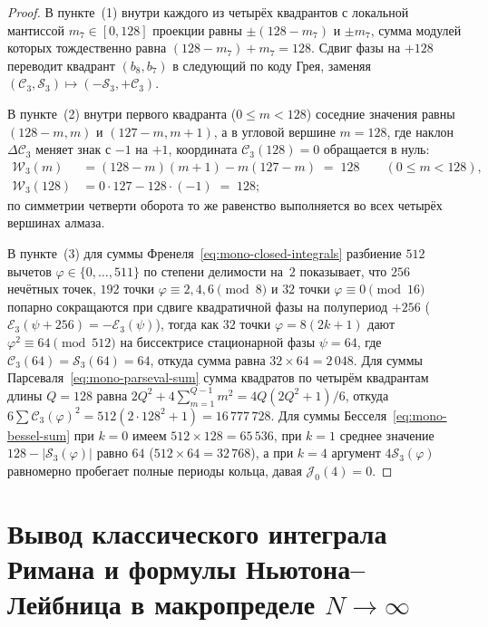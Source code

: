 \begin{proof}
В пункте~(1) внутри каждого из четырёх квадрантов с локальной мантиссой $m_7 \in [0, 128]$ проекции равны $\pm(128 - m_7)$ и $\pm m_7$, сумма модулей которых тождественно равна $(128 - m_7) + m_7 = 128$. Сдвиг фазы на $+128$ переводит квадрант $(b_8, b_7)$ в следующий по коду Грея, заменяя $(\mathcal{C}_3, \mathcal{S}_3) \mapsto (-\mathcal{S}_3, +\mathcal{C}_3)$.

В пункте~(2) внутри первого квадранта ($0 \le m < 128$) соседние значения равны $(128 - m, m)$ и $(127 - m, m + 1)$, а в угловой вершине $m = 128$, где наклон $\Delta\mathcal{C}_3$ меняет знак с $-1$ на $+1$, координата $\mathcal{C}_3(128) = 0$ обращается в нуль:
\begin{align*}
  \mathcal{W}_3(m) &= (128 - m)(m + 1) - m(127 - m) \;=\; 128 \qquad (0 \le m < 128), \\
  \mathcal{W}_3(128) &= 0 \cdot 127 - 128 \cdot (-1) \;=\; 128;
\end{align*}
по симметрии четверти оборота то же равенство выполняется во всех четырёх вершинах алмаза.

В пункте~(3) для суммы Френеля~\eqref{eq:mono-closed-integrals} разбиение $512$ вычетов $\varphi \in \{0,\dots,511\}$ по степени делимости на~$2$ показывает, что $256$ нечётных точек, $192$ точки $\varphi \equiv 2, 4, 6 \pmod 8$ и $32$ точки $\varphi \equiv 0 \pmod{16}$ попарно сокращаются при сдвиге квадратичной фазы на полупериод $+256$ ($\mathcal{E}_3(\psi + 256) = -\mathcal{E}_3(\psi)$), тогда как $32$ точки $\varphi = 8(2k + 1)$ дают $\varphi^2 \equiv 64 \pmod{512}$ на биссектрисе стационарной фазы $\psi = 64$, где $\mathcal{C}_3(64) = \mathcal{S}_3(64) = 64$, откуда сумма равна $32 \times 64 = 2\,048$. Для суммы Парсеваля~\eqref{eq:mono-parseval-sum} сумма квадратов по четырём квадрантам длины $Q = 128$ равна $2 Q^2 + 4\sum_{m=1}^{Q-1} m^2 = 4Q(2Q^2 + 1)/6$, откуда $6\sum \mathcal{C}_3(\varphi)^2 = 512(2\cdot 128^2 + 1) = 16\,777\,728$. Для суммы Бесселя~\eqref{eq:mono-bessel-sum} при $k = 0$ имеем $512\times 128 = 65\,536$, при $k = 1$ среднее значение $128 - |\mathcal{S}_3(\varphi)|$ равно $64$ ($512\times 64 = 32\,768$), а при $k = 4$ аргумент $4\mathcal{S}_3(\varphi)$ равномерно пробегает полные периоды кольца, давая $\mathcal{J}_0(4) = 0$.
\end{proof}

\section{Вывод классического интеграла Римана и формулы Ньютона--Лейбница в макропределе \texorpdfstring{$N \to \infty$}{N -> infty}}


